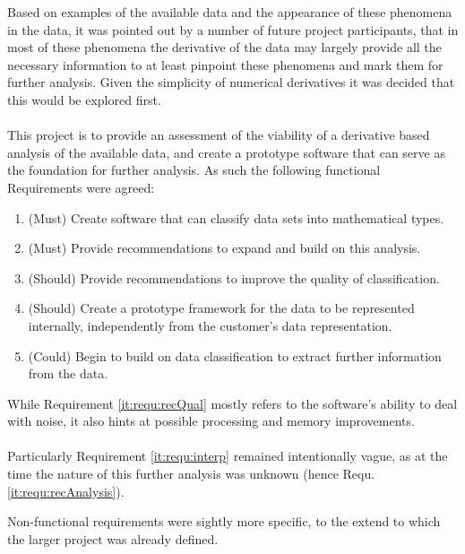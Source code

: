 \documentclass[main.tex]{subfiles}
\begin{document}
    Based on examples of the available data and the appearance of these phenomena in the data, it was pointed out by a number of future project participants, that in most of these phenomena the derivative of the data may largely provide all the necessary information to at least pinpoint these phenomena and mark them for further analysis. Given the simplicity of numerical derivatives it was decided that this would be explored first.
    \\\\ 
    This project is to provide an assessment of the viability of a derivative based analysis of the available data, and create a prototype software that can serve as the foundation for further analysis. As such the following functional Requirements were agreed:
    
    \begin{enumerate}
      \item \label{it:requ:classify} (Must) Create software that can classify data sets into mathematical types.
      \item \label{it:requ:recAnalysis} (Must) Provide recommendations to expand and build on this analysis.
      \item \label{it:requ:recQual} (Should) Provide recommendations to improve the quality of classification.
      \item \label{it:requ:data} (Should) Create a prototype framework for the data to be represented internally, independently from the customer's data representation.
      \item  \label{it:requ:interp} (Could) Begin to build on data classification to extract further information from the data.
    \end{enumerate}
    
    While Requirement \ref{it:requ:recQual} mostly refers to the software's ability to deal with noise, it also hints at possible processing and memory improvements.
    \\\\
    Particularly Requirement \ref{it:requ:interp} remained intentionally vague, as at the time the nature of this further analysis was unknown (hence Requ. \ref{it:requ:recAnalysis}).
    
    Non-functional requirements were sightly more specific, to the extend to which the larger project was already defined.
    
\end{document}
